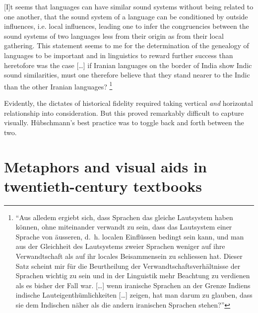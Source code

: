 \documentclass[output=paper]{langscibook}
\begin{document}
\begin{modquote}{}
[I]t seems that languages can have similar sound systems without being related to one another, that the sound system of a language can be conditioned by outside influences, i.e. local influences, leading one to infer the congruencies between the sound systems of two languages less from their origin as from their local gathering. This statement seems to me for the determination of the genealogy of languages to be important and in linguistics to reward further success than heretofore was the case […] if Iranian languages on the border of India show Indic sound similarities, must one therefore believe that they stand nearer to the Indic than the other Iranian languages? \citep[73]{Huebschmann1876}\footnote{``Aus alledem ergiebt sich, dass Sprachen das gleiche Lautsystem haben können, ohne miteinander verwandt zu sein, dass das Lautsystem einer Sprache von äusseren, d.~h. localen Einflüssen bedingt sein kann, und man aus der Gleichheit des Lautsystems zweier Sprachen weniger auf ihre Verwandtschaft als auf ihr locales Beisammensein zu schliessen hat. Dieser Satz scheint mir für die Beurtheilung der Verwandtschaftsverhältnisse der Sprachen wichtig zu sein und in der Linguistik mehr Beachtung zu verdienen als es bisher der Fall war. […] wenn iranische Sprachen an der Grenze Indiens indische Lauteigenthümlichkeiten […] zeigen, hat man darum zu glauben, dass sie dem Indischen näher als die andern iranischen Sprachen stehen?''}
\end{modquote}

Evidently, the dictates of historical fidelity required taking vertical \emph{and} horizontal relationship into consideration. But this proved remarkably difficult to capture visually. Hübschmann's best practice was to toggle back and forth between the two.

\section{Metaphors and visual aids in twentieth-century textbooks}
\label{sec:kaplan:textbooks}
\end{document}
